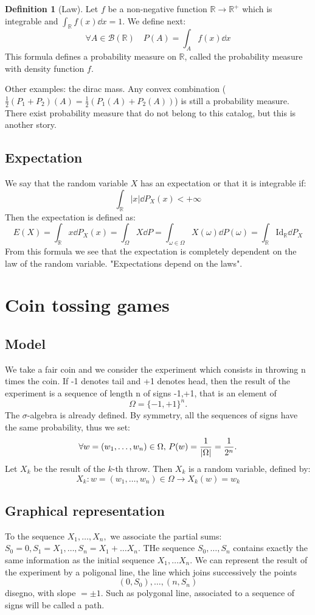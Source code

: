 \documentclass[10pt,a4paper]{book}
\theoremstyle{definition}
\newtheorem{definition}{Definition}[section]
\begin{document}
\begin{definition}[Law]
Let $f$ be a non-negative function $\mathbb{R} \to \mathbb{R}^+$ which is integrable and $\int_\mathbb{R} f(x) \dd x = 1$. We define next:
\[
\forall A \in \mathcal{B}(\mathbb{R}) \quad P(A) = \int_A f(x) \dd x
\]
This formula defines a probability measure on $\mathbb{R}$, called the probability measure with density function $f$.
\end{definition}
Other examples: the dirac mass. Any convex combination ($\frac{1}{2}(P_1+P_2)(A)=\frac{1}{2}(P_1(A)+P_2(A))$) is still a probability measure. There exist probability measure that do not belong to this catalog, but this is another story. 

\section{Expectation}

We say that the random variable $X$ has an expectation or that it is integrable if:
\[
\int_\mathbb{R} |x| \dd P_X(x) < +\infty
\]
Then the expectation is defined as:
\[
E(X) = \int_\mathbb{R} x \dd P_X(x) = \int_\Omega X \dd P = \int_{\omega \in \Omega} X(\omega)\dd P(\omega) = \int_\mathbb{R} \text{Id}_\mathbb{R} \dd P_X
\]
From this formula we see that the expectation is completely dependent on the law of the random variable.
"Expectations depend on the laws".


\chapter{Coin tossing games}


\section{Model}
We take a fair coin and we consider the experiment which consists in throwing n times the coin. If -1 denotes tail and +1 denotes head, then the result of the experiment is a sequence of 
length n of signs -1,+1, that is an element of $$\Omega=\{-1,+1\}^n.$$The $\sigma$-algebra is already defined.
By symmetry, all the sequences of signs have the same probability, thus we set:
$$\forall w=(w_1,\ldots,w_n)\in\Omega,\,\,\\
P(w)=\frac{1}{|\Omega|}=\frac{1}{2^n}.$$
Let $X_k$ be the result of the $k$-th throw. Then $X_k$ is a random variable, defined by:
$$X_k:w=(w_1,\ldots,w_n)\in\Omega\to X_k(w)=w_k$$


\section{Graphical representation}
To the sequence $X_1,\ldots,X_n,$ we associate the partial sums: $S_0=0,S_1=X_1,\ldots,S_n=X_1+\ldots X_n$. THe sequence $S_0,\ldots,S_n$ contains exactly the same information as the 
initial sequence $X_1,\ldots X_n$. We can represent the result of the experiment by a poligonal line, the line which joins successively the points
$$(0,S_0),\ldots, (n,S_n)$$
disegno, with slope $=\pm 1$.
Such as polygonal line, associated to a sequence of signs will be called a path. 
\end{document}
